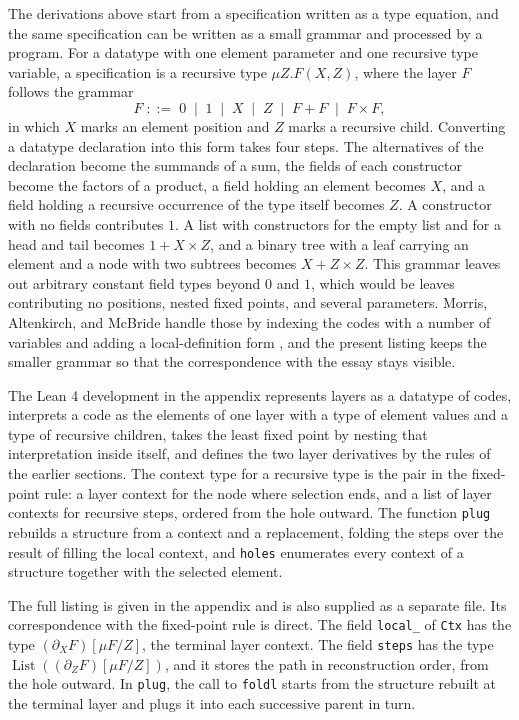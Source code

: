 \documentclass[11pt]{article}
\begin{document}
The derivations above start from a specification written as a type equation, and the same specification can be written as a small grammar and processed by a program. For a datatype with one element parameter and one recursive type variable, a specification is a recursive type $\mu Z.F(X,Z)$, where the layer $F$ follows the grammar
\[
F\;::=\;0\;\mid\;1\;\mid\;X\;\mid\;Z\;\mid\;F+F\;\mid\;F\times F,
\]
in which $X$ marks an element position and $Z$ marks a recursive child. Converting a datatype declaration into this form takes four steps. The alternatives of the declaration become the summands of a sum, the fields of each constructor become the factors of a product, a field holding an element becomes $X$, and a field holding a recursive occurrence of the type itself becomes $Z$. A constructor with no fields contributes $1$. A list with constructors for the empty list and for a head and tail becomes $1+X\times Z$, and a binary tree with a leaf carrying an element and a node with two subtrees becomes $X+Z\times Z$. This grammar leaves out arbitrary constant field types beyond $0$ and $1$, which would be leaves contributing no positions, nested fixed points, and several parameters. Morris, Altenkirch, and McBride handle those by indexing the codes with a number of variables and adding a local-definition form \cite{morris2006}, and the present listing keeps the smaller grammar so that the correspondence with the essay stays visible.

The Lean 4 development in the appendix represents layers as a datatype of codes, interprets a code as the elements of one layer with a type of element values and a type of recursive children, takes the least fixed point by nesting that interpretation inside itself, and defines the two layer derivatives by the rules of the earlier sections. The context type for a recursive type is the pair in the fixed-point rule: a layer context for the node where selection ends, and a list of layer contexts for recursive steps, ordered from the hole outward. The function \texttt{plug} rebuilds a structure from a context and a replacement, folding the steps over the result of filling the local context, and \texttt{holes} enumerates every context of a structure together with the selected element.

The full listing is given in the appendix and is also supplied as a separate file. Its correspondence with the fixed-point rule is direct. The field \texttt{local\_} of \texttt{Ctx} has the type $(\partial_X F)[\mu F/Z]$, the terminal layer context. The field \texttt{steps} has the type $\operatorname{List}((\partial_Z F)[\mu F/Z])$, and it stores the path in reconstruction order, from the hole outward. In \texttt{plug}, the call to \texttt{foldl} starts from the structure rebuilt at the terminal layer and plugs it into each successive parent in turn.
\end{document}
